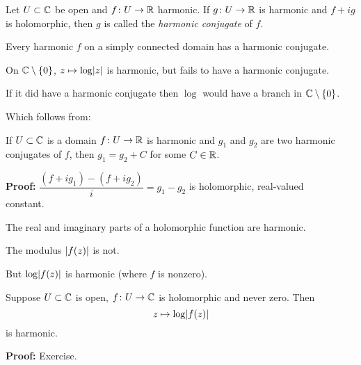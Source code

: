\documentclass[10pt,aspectratio=169]{beamer}
\begin{document}
\begin{frame}
\begin{definition}
Let $U \subset {\mathbb{C}}$ be open and $f \colon U \to {\mathbb{R}}$ harmonic.
If $g \colon U \to {\mathbb{R}}$ is harmonic and $f + i g$ is holomorphic,
then $g$ is called the \emph{harmonic conjugate} of $f$.
\end{definition}

\pause

Every harmonic $f$ on a simply connected domain has a harmonic conjugate.

\medskip
\pause

On ${\mathbb{C}} \setminus \{ 0 \}$,
$z \mapsto \log \lvert {z} \rvert$ is harmonic, but
fails to have a harmonic conjugate.

\medskip
\pause

If it did have a harmonic conjugate
then $\log$ would have a branch in ${\mathbb{C}} \setminus \{0\}$.

\pause
Which follows from:

\begin{proposition}
If $U \subset {\mathbb{C}}$ is a domain $f \colon U \to {\mathbb{R}}$ is harmonic
and $g_1$ and $g_2$ are two harmonic conjugates of $f$,
then $g_1 = g_2 + C$ for some $C \in {\mathbb{R}}$.
\end{proposition}

\pause
\textbf{Proof:}
$\dfrac{(f + i g_1) - (f + i g_2)}{i} =  g_1-g_2$
is holomorphic, real-valued ~\thus~ constant.

\end{frame}

\begin{frame}
The real and imaginary parts of a holomorphic function are harmonic.

\pause
\medskip

The modulus $\lvert {f(z)} \rvert$ is not.

\pause
\medskip

But $\log \lvert {f(z)} \rvert$ is harmonic (where $f$ is nonzero).

\pause

\begin{proposition}
Suppose $U \subset {\mathbb{C}}$ is open, $f \colon U \to {\mathbb{C}}$ is holomorphic
and never zero.  Then
\begin{equation*}
z \mapsto \log \lvert {f(z)} \rvert
\end{equation*}
is harmonic.
\end{proposition}

\textbf{Proof:} Exercise.
\end{frame}
\end{document}
